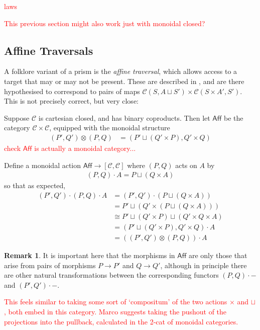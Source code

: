 \documentclass[11pt,a4paper]{article}
\theoremstyle{plain}
\theoremstyle{definition}
\newtheorem{remark}[theorem]{Remark}
\newcommand{\C}{\mathscr{C}}
\newcommand{\todo}[1]{\textcolor{red}{\small #1}}
\begin{document}
\todo{laws}

\todo{This previous section might also work just with monoidal closed?}

\subsection{Affine Traversals}

A folklore variant of a prism is the \emph{affine traversal}, which allows access to a target that may or may not be present. These are described in \cite{AffineTraversalPost}, and are there hypothesised to correspond to pairs of maps $\C(S, A \sqcup S') \times \C(S\times A', S')$. This is not precisely correct, but very close:

Suppose $\C$ is cartesian closed, and has binary coproducts. Then let $\mathsf{Aff}$ be the category $\C \times \C$, equipped with the monoidal structure
\begin{align*}
(P', Q') \otimes (P, Q) &= (P' \sqcup (Q' \times P) , Q' \times Q)
\end{align*}
\todo{check $\mathsf{Aff}$ is actually a monoidal category...}

Define a monoidal action $\mathsf{Aff} \to [\C, \C]$ where $(P, Q)$ acts on $A$ by
\begin{align*}
(P, Q) \cdot A = P \sqcup (Q \times A)
\end{align*}
so that as expected,
\begin{align*}
(P', Q') \cdot (P, Q) \cdot A 
&= (P', Q') \cdot  (P \sqcup (Q \times A)) \\
&= P' \sqcup (Q' \times (P \sqcup (Q \times A))) \\
&\cong P' \sqcup (Q' \times P) \sqcup (Q' \times Q \times A) \\
&= (P' \sqcup (Q' \times P) , Q' \times Q) \cdot A \\
&= ((P', Q') \otimes (P, Q)) \cdot A
\end{align*}

\begin{remark}
It is important here that the morphisms in $\mathsf{Aff}$ are only those that arise from pairs of morphisms $P \to P'$ and $Q \to Q'$, although in principle there are other natural transformations between the corresponding functors $(P, Q) \cdot -$ and $(P', Q') \cdot -$.
\end{remark}

\todo{This feels similar to taking some sort of `compositum' of the two actions $\times$ and $\sqcup$, both embed in this category. Marco suggests taking the pushout of the projections into the pullback, calculated in the 2-cat of monoidal categories.}
\end{document}

